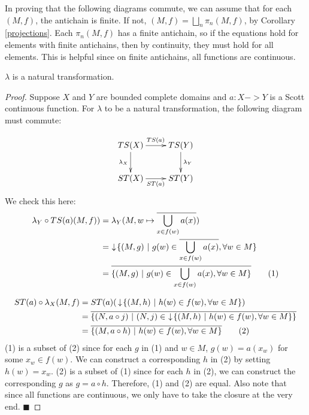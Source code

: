 In proving that the following diagrams commute, we can assume that for each $(M,f)$, the antichain is finite.  If not, $(M,f) = \bigsqcup_n \pi_n(M,f)$, by Corollary \ref{projections}.  Each $\pi_n(M,f)$ has a finite antichain, so if the equations hold for elements with finite antichains, then by continuity, they must hold for all elements.  This is helpful since on finite antichains, all functions are continuous.

\begin{proposition}
$\lambda$ is a natural transformation.
\end{proposition}
\begin{proof}
Suppose $X$ and $Y$ are bounded complete domains and $a:X->Y$ is a Scott continuous function.  For $\lambda$ to be a natural transformation, the following diagram must commute:

\[
\xymatrix{
TS(X)\ar[r]^{TS(a)}\ar[d]_{\lambda_X} & TS(Y)\ar[d]^{\lambda_Y} \\
ST(X)\ar[r]_{ST(a)} & ST(Y)
}
\]
We check this here:
\begin{align*}
\lambda_Y \circ TS(a)(M,f)) &= \lambda_Y(M,w\mapsto \overline{\bigcup_{x\in f(w)}a(x)}) \\
&= \,\,\downarrow\! \{(M,g)\ |\ g(w)\in \overline{\bigcup_{x\in f(w)}a(x)}, \forall w\in M\} \\
&= \overline{\{(M,g)\ |\ g(w)\in \bigcup_{x\in f(w)}a(x), \forall w\in M\}} \tag{1}
\end{align*}

\begin{align*}
ST(a)\circ \lambda_X(M,f) &= 
ST(a)(\,\downarrow\! \{(M,h)\ |\ h(w)\in f(w), \forall w\in M\}) \\ 
&= \overline{\{(N,a\circ j)\ |\ (N,j)\in\, \,\downarrow\! \{(M,h)\ |\ h(w)\in f(w), \forall w\in M\}\}} \\
&= \overline{\{(M,a\circ h)\ |\ h(w)\in f(w), \forall w\in M\}} \tag{2}
\end{align*}
(1) is a subset of (2) since for each $g$ in (1) and $w\in M$, $g(w) = a(x_w)$ for some $x_w\in f(w)$.  We can construct a corresponding $h$ in (2) by setting $h(w)=x_w$.  (2) is a subset of (1) since for each $h$ in (2), we can construct the corresponding $g$ as $g=a\circ h$.  Therefore, (1) and (2) are equal.  Also note that since all functions are continuous, we only have to take the closure at the very end.
\hfill $\blacksquare$
\end{proof}

